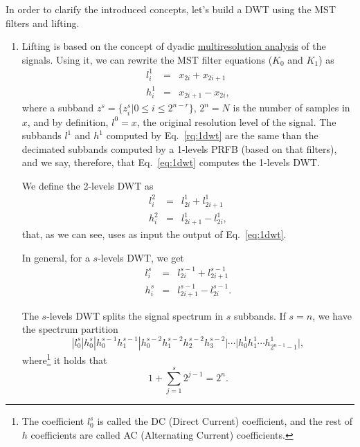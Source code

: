 In order to clarify the introduced concepts, let's build a DWT using
the MST filters and lifting.

\begin{enumerate}
\item Lifting is based on the concept of dyadic
  \href{https://en.wikipedia.org/wiki/Multiresolution_analysis}{multiresolution
    analysis} of the signals. Using it, we can rewrite the MST filter
  equations ($K_0$ and $K_1$) as
  \begin{equation}
    \begin{array}{rcl}
      l^1_i & = & x_{2i} + x_{2i+1} \\
      h^1_i & = & x_{2i+1} - x_{2i},
    \end{array}
    \label{eq:1dwt}
  \end{equation}
  where a subband $z^s=\{z_i^s|0\le i\le 2^{n-r}\}$, $2^n=N$ is the
  number of samples in $x$, and by definition, $l^0=x$, the original
  resolution level of the signal. The subbands $l^1$ and $h^1$
  computed by Eq.~\ref{rq:1dwt} are the same than the decimated
  subbands computed by a 1-levels PRFB (based on that filters), and we
  say, therefore, that Eq.~\ref{eq:1dwt} computes the 1-levels DWT.

  We define the 2-levels DWT as
  \begin{equation}
    \begin{array}{rcl}
      l^2_i & = & l^1_{2i} + l^1_{2i+1} \\
      h^2_i & = & l^1_{2i+1} - l^1_{2i},
    \end{array}
    \label{eq:2dwt}
  \end{equation}
  that, as we can see, uses as input the output of Eq.~\ref{eq:1dwt}.

  In general, for a $s$-levels DWT, we get
    \begin{equation}
    \begin{array}{rcl}
      l^s_i & = & l^{s-1}_{2i} + l^{s-1}_{2i+1} \\
      h^s_i & = & l^{s-1}_{2i+1} - l^{s-1}_{2i}.
    \end{array}
    \label{eq:2dwt}
  \end{equation}

  The $s$-levels DWT splits the signal spectrum in $s$ subbands. If
  $s=n$, we have the spectrum partition
  \begin{equation*}
    | l^s_0 | h^s_0 | h^{s-1}_0 h^{s-1}_1 | h^{s-2}_0 h^{s-2}_1 h^{s-2}_2 h^{s-2}_3 | \cdots | h^1_0 h^1_1 \cdots h^1_{2^{n-1}-1} |,
  \end{equation*}
  where\footnote{The coefficient $l^s_0$ is called the DC (Direct
    Current) coefficient, and the rest of $h$ coefficients are called
    AC (Alternating Current) coefficients.} it holds that
  \begin{equation}
    1+\sum_{j=1}^s 2^{j-1}=2^n.
  \end{equation}


\end{enumerate}
